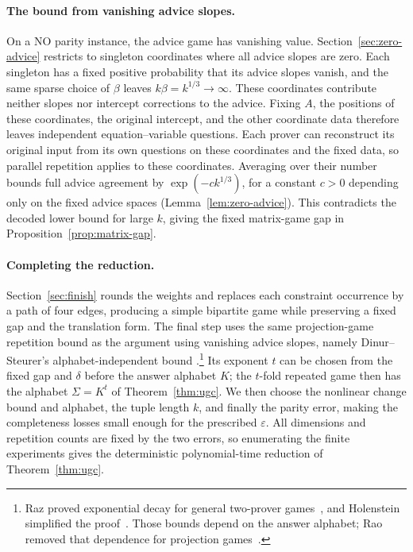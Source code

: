 \paragraph{The bound from vanishing advice slopes.}
On a NO parity instance, the advice game has vanishing value.
Section~\ref{sec:zero-advice} restricts to singleton coordinates where all
advice slopes are zero. Each singleton has a fixed positive probability
that its advice slopes vanish, and the same sparse choice of \(\beta\) leaves
\(k\beta=k^{1/3}\to\infty\). These coordinates contribute neither
slopes nor intercept corrections to the advice. Fixing \(A\), the positions of these
coordinates, the original intercept, and the other coordinate data therefore
leaves independent equation--variable questions. Each prover can reconstruct
its original input from its own questions on these coordinates and the fixed data, so
parallel repetition applies to these coordinates. Averaging over their
number bounds full advice agreement by \(\exp(-c k^{1/3})\), for a
constant \(c>0\) depending only on the fixed advice spaces
(Lemma~\ref{lem:zero-advice}). This contradicts the decoded lower bound for
large \(k\), giving the fixed matrix-game gap in
Proposition~\ref{prop:matrix-gap}.

\paragraph{Completing the reduction.}
Section~\ref{sec:finish} rounds the weights and replaces each constraint
occurrence by a path of four edges, producing a simple bipartite game
while preserving a fixed gap and the translation form. The final step
uses the same projection-game repetition bound as the argument using vanishing advice
slopes, namely Dinur--Steurer's alphabet-independent bound
\cite[Corollary~1.2]{DS14}.\footnote{Raz proved exponential decay for
general two-prover games~\cite{Raz98}, and Holenstein simplified the
proof~\cite{Holenstein2009}. Those bounds depend on the answer alphabet;
Rao removed that dependence for projection games~\cite[Theorem~4]{Rao11}.}
Its exponent \(t\) can be chosen from the fixed gap and \(\delta\) before
the answer alphabet \(K\); the \(t\)-fold repeated game then has the
alphabet \(\Sigma=K^t\) of Theorem~\ref{thm:ugc}. We then choose the nonlinear change bound and alphabet,
the tuple length \(k\), and finally the parity error, making the
completeness losses small enough for the prescribed \(\varepsilon\).
All dimensions and repetition counts are fixed by the two errors, so
enumerating the finite experiments gives the deterministic polynomial-time
reduction of Theorem~\ref{thm:ugc}.

